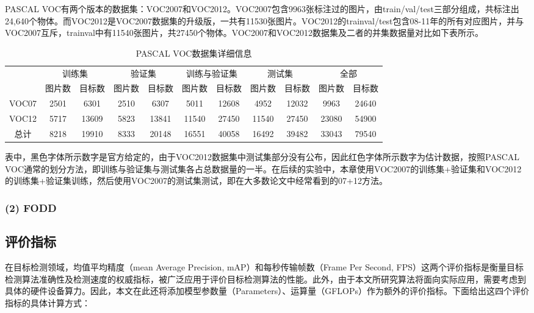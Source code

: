 PASCAL VOC有两个版本的数据集：VOC2007和VOC2012。VOC2007包含9963张标注过的图片，由train/val/test三部分组成，共标注出24,640个物体。而VOC2012是VOC2007数据集的升级版，一共有11530张图片。VOC2012的trainval/test包含08-11年的所有对应图片，并与VOC2007互斥，trainval中有11540张图片，共27450个物体。VOC2007和VOC2012数据集及二者的并集数据量对比如下表所示。
\begin{table}[htbp]
	\centering
	\small
	\caption{PASCAL VOC数据集详细信息}
	\setlength{\tabcolsep}{1.3mm}
	\begin{tabular}{ccccccccccc}
		\toprule[2pt]
		\multirow{2}[4]{*}{} & \multicolumn{2}{c}{训练集} & \multicolumn{2}{c}{验证集} & \multicolumn{2}{c}{训练与验证集} & \multicolumn{2}{c}{测试集} & \multicolumn{2}{c}{全部} \\
		\cmidrule{2-11}          & 图片数   & 目标数   & 图片数   & 目标数   & 图片数   & 目标数   & 图片数   & 目标数   & 图片数   & 目标数 \\
		\midrule
		VOC07 & 2501  & 6301  & 2510  & 6307  & 5011  & 12608 & 4952  & 12032 & 9963  & 24640 \\
		VOC12 & 5717  & 13609 & 5823  & 13841 & 11540 & 27450 & {\color{red} 11540} & {\color{red} 27450} & {\color{red} 23080} & {\color{red} 54900} \\
		总计    & 8218  & 19910 & 8333  & 20148 & 16551 & 40058 & {\color{red} 16492} & {\color{red} 39482} & {\color{red} 33043} & {\color{red} 79540} \\
		\bottomrule[2pt]
	\end{tabular}%
	\label{pascal voc}%
\end{table}%

表中，黑色字体所示数字是官方给定的，由于VOC2012数据集中测试集部分没有公布，因此红色字体所示数字为估计数据，按照PASCAL VOC通常的划分方法，即训练与验证集与测试集各占总数据量的一半。在后续的实验中，本章使用VOC2007的训练集+验证集和VOC2012的训练集+验证集训练，然后使用VOC2007的测试集测试，即在大多数论文中经常看到的07+12方法。
\subsubsection*{(2) FODD}

\subsection{评价指标}
在目标检测领域，均值平均精度（mean Average Precision, mAP）和每秒传输帧数（Frame Per Second, FPS）这两个评价指标是衡量目标检测算法准确性及检测速度的权威指标，被广泛应用于评价目标检测算法的性能。此外，由于本文所研究算法将面向实际应用，需要考虑到具体的硬件设备算力。因此，本文在此还将添加模型参数量（Parameters）、运算量（GFLOPs）作为额外的评价指标。下面给出这四个评价指标的具体计算方式：

